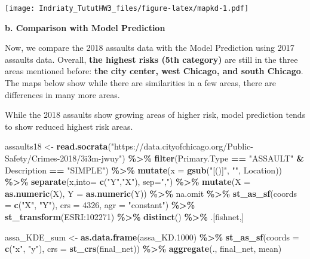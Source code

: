 \documentclass[
]{article}
\newenvironment{Shaded}{\begin{snugshade}}{\end{snugshade}}
\newcommand{\AttributeTok}[1]{\textcolor[rgb]{0.13,0.29,0.53}{#1}}
\newcommand{\DecValTok}[1]{\textcolor[rgb]{0.00,0.00,0.81}{#1}}
\newcommand{\FloatTok}[1]{\textcolor[rgb]{0.00,0.00,0.81}{#1}}
\newcommand{\FunctionTok}[1]{\textcolor[rgb]{0.13,0.29,0.53}{\textbf{#1}}}
\newcommand{\NormalTok}[1]{#1}
\newcommand{\OtherTok}[1]{\textcolor[rgb]{0.56,0.35,0.01}{#1}}
\newcommand{\SpecialCharTok}[1]{\textcolor[rgb]{0.81,0.36,0.00}{\textbf{#1}}}
\newcommand{\StringTok}[1]{\textcolor[rgb]{0.31,0.60,0.02}{#1}}
\begin{document}
\texttt{[image: Indriaty\_TututHW3\_files/figure-latex/mapkd-1.pdf]}

\textbf{b. Comparison with Model Prediction}

Now, we compare the 2018 assaults data with the Model Prediction using
2017 assaults data. Overall, \textbf{the highest risks (5th category)}
are still in the three areas mentioned before: \textbf{the city center,
west Chicago, and south Chicago}. The maps below show while there are
similarities in a few areas, there are differences in many more areas.

While the 2018 assaults show growing areas of higher risk, model
prediction tends to show reduced highest risk areas.

\begin{Shaded}
\begin{Highlighting}[]
\NormalTok{assaults18 }\OtherTok{\textless{}{-}} 
  \FunctionTok{read.socrata}\NormalTok{(}\StringTok{"https://data.cityofchicago.org/Public{-}Safety/Crimes{-}2018/3i3m{-}jwuy"}\NormalTok{) }\SpecialCharTok{\%\textgreater{}\%} 
  \FunctionTok{filter}\NormalTok{(Primary.Type }\SpecialCharTok{==} \StringTok{"ASSAULT"} \SpecialCharTok{\&} 
\NormalTok{         Description }\SpecialCharTok{==} \StringTok{"SIMPLE"}\NormalTok{) }\SpecialCharTok{\%\textgreater{}\%}
  \FunctionTok{mutate}\NormalTok{(}\AttributeTok{x =} \FunctionTok{gsub}\NormalTok{(}\StringTok{"[()]"}\NormalTok{, }\StringTok{""}\NormalTok{, Location)) }\SpecialCharTok{\%\textgreater{}\%}
  \FunctionTok{separate}\NormalTok{(x,}\AttributeTok{into=} \FunctionTok{c}\NormalTok{(}\StringTok{"Y"}\NormalTok{,}\StringTok{"X"}\NormalTok{), }\AttributeTok{sep=}\StringTok{","}\NormalTok{) }\SpecialCharTok{\%\textgreater{}\%}
  \FunctionTok{mutate}\NormalTok{(}\AttributeTok{X =} \FunctionTok{as.numeric}\NormalTok{(X),}
         \AttributeTok{Y =} \FunctionTok{as.numeric}\NormalTok{(Y)) }\SpecialCharTok{\%\textgreater{}\%} 
\NormalTok{  na.omit }\SpecialCharTok{\%\textgreater{}\%}
  \FunctionTok{st\_as\_sf}\NormalTok{(}\AttributeTok{coords =} \FunctionTok{c}\NormalTok{(}\StringTok{"X"}\NormalTok{, }\StringTok{"Y"}\NormalTok{), }\AttributeTok{crs =} \DecValTok{4326}\NormalTok{, }\AttributeTok{agr =} \StringTok{"constant"}\NormalTok{) }\SpecialCharTok{\%\textgreater{}\%}
  \FunctionTok{st\_transform}\NormalTok{(}\StringTok{\textquotesingle{}ESRI:102271\textquotesingle{}}\NormalTok{) }\SpecialCharTok{\%\textgreater{}\%} 
  \FunctionTok{distinct}\NormalTok{() }\SpecialCharTok{\%\textgreater{}\%}
\NormalTok{  .[fishnet,]}

\NormalTok{assa\_KDE\_sum }\OtherTok{\textless{}{-}} \FunctionTok{as.data.frame}\NormalTok{(assa\_KD}\FloatTok{.1000}\NormalTok{) }\SpecialCharTok{\%\textgreater{}\%}
  \FunctionTok{st\_as\_sf}\NormalTok{(}\AttributeTok{coords =} \FunctionTok{c}\NormalTok{(}\StringTok{"x"}\NormalTok{, }\StringTok{"y"}\NormalTok{), }\AttributeTok{crs =} \FunctionTok{st\_crs}\NormalTok{(final\_net)) }\SpecialCharTok{\%\textgreater{}\%}
  \FunctionTok{aggregate}\NormalTok{(., final\_net, mean) }



\end{Highlighting}
\end{Shaded}
\end{document}
